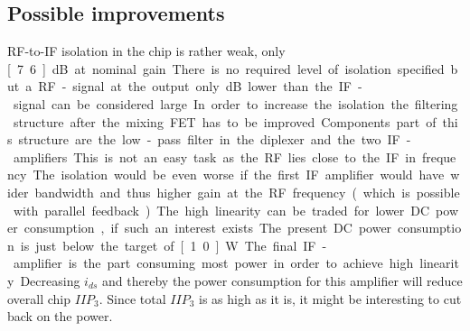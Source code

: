 		\subsection{Possible improvements}
			RF-to-IF isolation in the chip is rather weak, only \unit[7.6]{dB} at nominal gain. There is no required level of isolation specified but a RF-signal at the output only \unit[18]{dB} lower than the IF-signal can be considered large. In order to increase the isolation the filtering structure after the mixing FET has to be improved. Components part of this structure are the low-pass filter in the diplexer and the two IF-amplifiers. This is not an easy task as the RF lies close to the IF in frequency. The isolation would be even worse if the first IF amplifier would have wider bandwidth and thus higher gain at the RF frequency (which is possible with parallel feedback).
			
			The high linearity can be traded for lower DC power consumption, if such an interest exists. The present DC power consumption is just below the target of \unit[1.0]{W}. The final IF-amplifier is the part consuming most power in order to achieve high linearity. Decreasing $i_{ds}$ and thereby the power consumption for this amplifier will reduce overall chip $IIP_3$. Since total $IIP_3$ is as high as it is, it might be interesting to cut back on the power.
